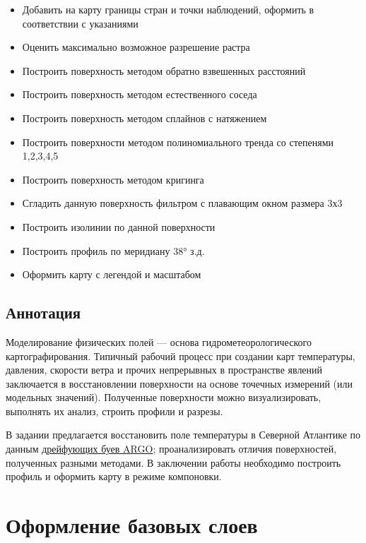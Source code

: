 \documentclass[12pt,]{book}
\providecommand{\tightlist}{%
  \setlength{\itemsep}{0pt}\setlength{\parskip}{0pt}}
\begin{document}
\begin{itemize}
\tightlist
\item
  Добавить на карту границы стран и точки наблюдений, оформить в соответствии с указаниями
\item
  Оценить максимально возможное разрешение растра
\item
  Построить поверхность методом обратно взвешенных расстояний
\item
  Построить поверхность методом естественного соседа
\item
  Построить поверхность методом сплайнов с натяжением
\item
  Построить поверхности методом полиномиального тренда со степенями 1,2,3,4,5
\item
  Построить поверхность методом кригинга
\item
  Сгладить данную поверхность фильтром с плавающим окном размера 3х3
\item
  Построить изолинии по данной поверхности
\item
  Построить профиль по меридиану 38° з.д.
\item
  Оформить карту с легендой и масштабом
\end{itemize}

\hypertarget{interpolation-annotation}{%
\subsection{Аннотация}\label{interpolation-annotation}}

Моделирование физических полей --- основа гидрометеорологического картографирования. Типичный рабочий процесс при создании карт температуры, давления, скорости ветра и прочих непрерывных в пространстве явлений заключается в восстановлении поверхности на основе точечных измерений (или модельных значений). Полученные поверхности можно визуализировать, выполнять их анализ, строить профили и разрезы.

В задании предлагается восстановить поле температуры в Северной Атлантике по данным \href{http://www.argo.ucsd.edu}{дрейфующих буев ARGO}; проанализировать отличия поверхностей, полученных разными методами. В заключении работы необходимо построить профиль и оформить карту в режиме компоновки.

\hypertarget{interpolation-base}{%
\section{Оформление базовых слоев}\label{interpolation-base}}
\end{document}
